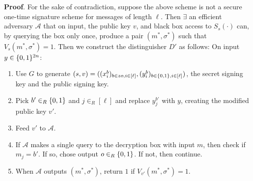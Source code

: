 \documentclass{article}
\begin{document}
\begin{enumerate}
\begin{itemize}
\begin{mdbmarginx}{1ex}{0pt}{1ex}{0pt}%
\noindent{}\textbf{Proof}.  For the sake of contradiction, suppose the above scheme is not a secure one-time signature scheme for
messages of length $\ell$. Then $\exists$ an efficient adversary $\mathcal{A}$ that on input, the
public key $v$, and black box access to $S_s(\cdot)$ can, by querying the box only once, produce a
pair $(m^*,\sigma^*)$ such that $V_s(m^*,\sigma^*) = 1$. Then we construct the distinguisher $D'$ as 
follows:
On input $y \in \{0,1\}^{2n}$:%

\begin{enumerate}[noitemsep,topsep=\mdcompacttopsep]%

\item{}Use $G$ to generate $(s,v) = ((x_i^b)_{b \in zo, i \in [\ell]}, (y_i^b)_{b \in \{0,1\}, i \in [\ell]})$,
the secret signing key and the public signing key.%

\item{}Pick $b' \in_R \{0,1\}$ and $j \in_R [\ell]$ and replace $y_{j}^{b'}$ with $y$, creating the modified
public key $v'$.%

\item{}Feed $v'$ to $\mathcal{A}$.%

\item{}If $\mathcal{A}$ makes a single query to the decryption box with input $m$, then check
if $m_j = b'$. If so, chose output $o \in_R \{0,1\}$. If not, then continue.%

\item{}When $\mathcal{A}$ outputs $(m^*,\sigma^*)$, return $1$ if $V_{v'}(m^*,\sigma^*) = 1$.%
\end{enumerate}%
\end{mdbmarginx}%


\end{itemize}
\end{enumerate}
\end{document}
